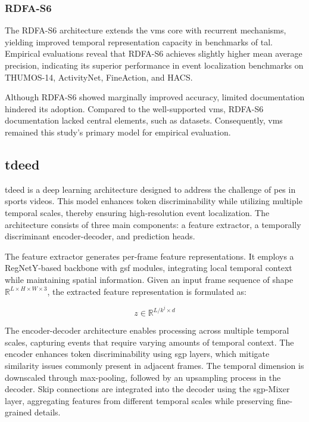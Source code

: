 \subsubsection{RDFA-S6}
The RDFA-S6 architecture extends the \acrshort{vms} core with recurrent mechanisms, yielding improved temporal representation capacity in benchmarks of \acrfull{tal}. Empirical evaluations reveal that RDFA-S6 achieves slightly higher mean average precision, indicating its superior performance in event localization benchmarks on THUMOS-14, ActivityNet, FineAction, and HACS. 

Although RDFA-S6 showed marginally improved accuracy, limited documentation hindered its adoption. Compared to the well-supported \acrlong{vms}, RDFA-S6 documentation lacked central elements, such as datasets. Consequently, \acrshort{vms} remained this study's primary model for empirical evaluation. 


\subsection{\acrfull{tdeed}}
\label{ssec:tdeed}

\acrfull{tdeed} is a deep learning architecture designed to address the challenge of \acrfull{pes} in sports videos. This model enhances token discriminability while utilizing multiple temporal scales, thereby ensuring high-resolution event localization. The architecture consists of three main components: a feature extractor, a temporally discriminant encoder-decoder, and prediction heads\cite{xarles_t-deed_2024}.

The feature extractor generates per-frame feature representations. It employs a RegNetY-based backbone with \acrfull{gsf} modules, integrating local temporal context while maintaining spatial information. Given an input frame sequence of shape \(\mathbb{R}^{L \times H \times W \times 3}\), the extracted feature representation is formulated as:

\[
z \in \mathbb{R}^{L/{k^j \times d} }
\]

The encoder-decoder architecture enables processing across multiple temporal scales, capturing events that require varying amounts of temporal context. The encoder enhances token discriminability using \acrfull{sgp} layers, which mitigate similarity issues commonly present in adjacent frames. The temporal dimension is downscaled through max-pooling, followed by an upsampling process in the decoder. Skip connections are integrated into the decoder using the \acrshort{sgp}-Mixer layer, aggregating features from different temporal scales while preserving fine-grained details.

